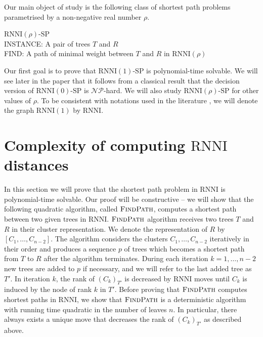 \documentclass[11pt]{amsart}
\newcommand{\rnni}{\mathrm{RNNI}}
\newcommand{\findpath}{\textsc{FindPath}}
\newcommand{\np}{\mathcal{NP}}
\newcommand{\decprob}[1]{\rnni(#1)\text{-}\mathrm{SP}}
\newcommand{\summary}[1]{} %
\begin{document}
Our main object of study is the following class of shortest path problems parametrised by a non-negative real number $\rho$.

\medskip

\noindent $\decprob{\rho}$
\medskip\\
INSTANCE: A pair of trees $T$ and $R$\\
FIND: A path of minimal weight between $T$ and $R$ in $\rnni(\rho)$

\medskip

Our first goal is to prove that $\decprob{1}$ is polynomial-time solvable.
We will see later in the paper that it follows from a classical result \autocite{Dasgupta2000-xa} that the decision version
 of $\decprob{0}$ is $\np$-hard.
We will also study $\decprob{\rho}$ for other values of $\rho$.
To be consistent with notations used in the literature \autocite{Gavryushkin2018-ol}, we will denote the graph $\rnni(1)$ by $\rnni$.


\section{Complexity of computing $\rnni$ distances}
\label{sec:rnni_complexity}

\summary{Introducing $\findpath$.}
In this section we will prove that the shortest path problem in $\rnni$ is polynomial-time solvable.
Our proof will be constructive -- we will show that the following quadratic algorithm, called $\findpath$, computes a shortest path between two given trees in $\rnni$.
$\findpath$ algorithm receives two trees $T$ and $R$ in their cluster representation.
We denote the representation of $R$ by $[C_1, \ldots, C_{n-2}]$.
The algorithm considers the clusters $C_1, \ldots, C_{n-2}$ iteratively in their order and produces a sequence $p$ of trees which becomes a shortest path from $T$ to $R$ after the algorithm terminates.
During each iteration $k = 1, \ldots, n-2$ new trees are added to $p$ if necessary, and we will refer to the last added tree as $T'$.
In iteration $k$, the rank of $(C_{k})_{T'}$ is decreased by $\rnni$ moves until $C_k$ is induced by the node of rank $k$ in $T'$.
Before proving that $\findpath$ computes shortest paths in $\rnni$, we show that $\findpath$ is a deterministic algorithm with running time quadratic in the number of leaves $n$.
In particular, there always exists a unique move that decreases the rank of $(C_{k})_{T'}$ as described above.
\end{document}

